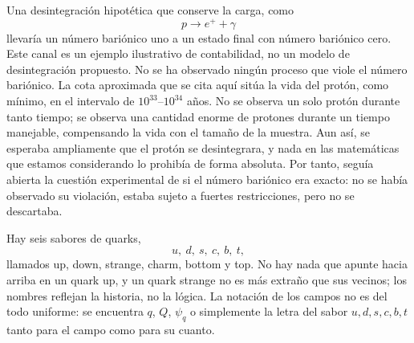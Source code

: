Una desintegración hipotética que conserve la carga, como
\begin{equation}
p\longrightarrow e^++\gamma
\end{equation}
llevaría un número bariónico uno a un estado final con número bariónico cero. Este canal es un ejemplo ilustrativo de contabilidad, no un modelo de desintegración propuesto. No se ha observado ningún proceso que viole el número bariónico. La cota aproximada que se cita aquí sitúa la vida del protón, como mínimo, en el intervalo de \(10^{33}\)--\(10^{34}\) años. No se observa un solo protón durante tanto tiempo; se observa una cantidad enorme de protones durante un tiempo manejable, compensando la vida con el tamaño de la muestra. Aun así, se esperaba ampliamente que el protón se desintegrara, y nada en las matemáticas que estamos considerando lo prohibía de forma absoluta. Por tanto, seguía abierta la cuestión experimental de si el número bariónico era exacto: no se había observado su violación, estaba sujeto a fuertes restricciones, pero no se descartaba.

\begin{classroomqa}
\end{classroomqa}

Hay seis sabores de quarks,
\begin{equation}
u,\ d,\ s,\ c,\ b,\ t,
\end{equation}
llamados up, down, strange, charm, bottom y top. No hay nada que apunte hacia arriba en un quark up, y un quark strange no es más extraño que sus vecinos; los nombres reflejan la historia, no la lógica. La notación de los campos no es del todo uniforme: se encuentra \(q\), \(Q\), \(\psi_q\) o simplemente la letra del sabor \(u,d,s,c,b,t\) tanto para el campo como para su cuanto.

\begin{classroomqa}
\end{classroomqa}

